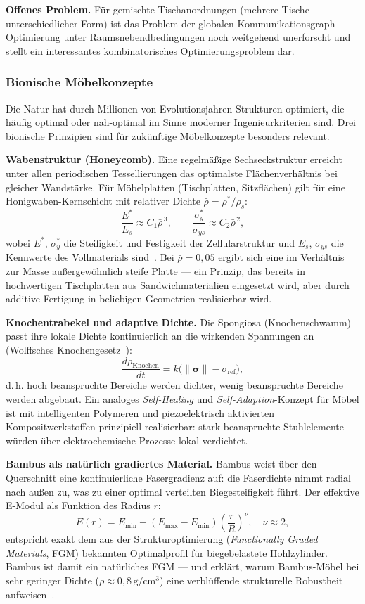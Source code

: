 ﻿\documentclass[a4paper,12pt]{article}
\theoremstyle{definition}
\begin{document}
\textbf{Offenes Problem.}
F\"{u}r gemischte Tischanordnungen (mehrere Tische unterschiedlicher Form) ist das
Problem der globalen Kommunikationsgraph-Optimierung unter Raumsnebendbedingungen
noch weitgehend unerforscht und stellt ein interessantes kombinatorisches
Optimierungsproblem dar.

\subsubsection{Bionische M\"{o}belkonzepte}
\label{sec:bionisch}

Die Natur hat durch Millionen von Evolutionsjahren Strukturen optimiert, die
h\"{a}ufig optimal oder nah-optimal im Sinne moderner Ingenieurkriterien sind.
Drei bionische Prinzipien sind f\"{u}r zuk\"{u}nftige M\"{o}belkonzepte besonders relevant.

\textbf{Wabenstruktur (Honeycomb).}
Eine regelm\"{a}\ss{}ige Sechseckstruktur erreicht unter allen periodischen
Tessellierungen das optimalste Fl\"{a}chenverh\"{a}ltnis bei gleicher Wandst\"{a}rke.
F\"{u}r M\"{o}belplatten (Tischplatten, Sitzfl\"{a}chen) gilt f\"{u}r eine Honigwaben-Kernschicht
mit relativer Dichte $\bar\rho = \rho^*/\rho_s$:
\[
	\frac{E^*}{E_s} \approx C_1 \bar\rho^{\,3},
	\qquad
	\frac{\sigma^*_y}{\sigma_{ys}} \approx C_2 \bar\rho^{\,2},
\]
wobei $E^*$, $\sigma^*_y$ die Steifigkeit und Festigkeit der Zellularstruktur
und $E_s$, $\sigma_{ys}$ die Kennwerte des Vollmaterials sind~\cite{GibsonAshby1997}.
Bei $\bar\rho = 0{,}05$ ergibt sich eine im Verh\"{a}ltnis zur Masse
au\ss{}ergew\"{o}hnlich steife Platte --- ein Prinzip, das bereits in
hochwertigen Tischplatten aus Sandwichmaterialien eingesetzt wird,
aber durch additive Fertigung in beliebigen Geometrien realisierbar wird.

\textbf{Knochentrabekel und adaptive Dichte.}
Die Spongiosa (Knochenschwamm) passt ihre lokale Dichte kontinuierlich an
die wirkenden Spannungen an (Wolffsches Knochengesetz~\cite{Wolff1892}):
\[
	\frac{d\rho_{\mathrm{Knochen}}}{dt} = k\bigl(\|\boldsymbol{\sigma}\| - \sigma_{\mathrm{ref}}\bigr),
\]
d.\,h. hoch beanspruchte Bereiche werden dichter, wenig beanspruchte Bereiche
werden abgebaut. Ein analoges \emph{Self-Healing} und \emph{Self-Adaption}-Konzept
f\"{u}r M\"{o}bel ist mit intelligenten Polymeren und piezoelektrisch aktivierten
Kompositwerkstoffen prinzipiell realisierbar: stark beanspruchte Stuhlelemente
w\"{u}rden \"{u}ber elektrochemische Prozesse lokal verdichtet.

\textbf{Bambus als nat\"{u}rlich gradiertes Material.}
Bambus weist \"{u}ber den Querschnitt eine kontinuierliche Fasergradienz auf:
die Faserdichte nimmt radial nach au\ss{}en zu, was zu einer optimal verteilten
Biegesteifigkeit f\"{u}hrt. Der effektive E-Modul als Funktion des Radius $r$:
\[
	E(r) = E_{\min} + (E_{\max} - E_{\min})\left(\frac{r}{R}\right)^\nu, \quad \nu \approx 2,
\]
entspricht exakt dem aus der Strukturoptimierung (\emph{Functionally Graded Materials},
FGM) bekannten Optimalprofil f\"{u}r biegebelastete Hohlzylinder. Bambus ist damit
ein nat\"{u}rliches FGM --- und erkl\"{a}rt, warum Bambus-M\"{o}bel bei sehr geringer Dichte
($\rho \approx 0{,}8\,\mathrm{g/cm^3}$) eine verbl\"{u}ffende strukturelle Robustheit aufweisen~\cite{AmadaEtAl1996}.
\end{document}
